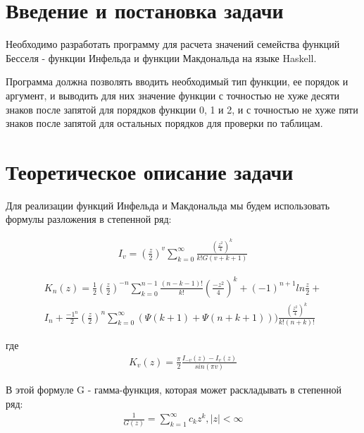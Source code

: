 \documentclass[a4paper,14pt]{extarticle}
\begin{document}
\section{Введение и постановка задачи}
Необходимо разработать программу для расчета значений семейства функций Бесселя - функции Инфельда и функции Макдональда на языке Haskell.

Программа должна позволять вводить необходимый тип функции, ее порядок и аргумент, и выводить для них значение функции с точностью не хуже десяти знаков после запятой для порядков функции 0, 1 и 2, и с точностью не хуже пяти знаков после запятой для остальных порядков для проверки по таблицам. 

\section{Теоретическое описание задачи}
Для реализации функций Инфельда и Макдональда мы будем использовать формулы разложения в степенной ряд:

\begin{align*}
	I_v = (\frac{z}{2})^v \sum_{k=0}^{\infty} 
	\frac{(\frac{z^2}{4})^k}{k!G(v+k+1)}
\end{align*}

\begin{multline*}
	K_n(z) = \frac{1}{2} (\frac{z}{2})^{-n} \sum_{k=0}^{n-1} 
	\frac{(n-k-1)!}{k!} (\frac{-z^2}{4})^k + (-1)^{n+1} ln \frac{z}{2} + \\
	I_n + \frac{-1^n}{2} (\frac{z}{2})^n \sum_{k=0}^{\infty}
	(\Psi(k+1)+\Psi(n+k+1))) \frac{(\frac{z^2}{4})^k}{k!(n+k)!}
\end{multline*}

где
\begin{align*}
	K_v(z) = \frac{\pi}{2} \frac{I_{-v}(z)-I_v(z)}{sin(\pi v)}
\end{align*}


В этой формуле G - гамма-функция, которая может раскладывать в степенной ряд:
\begin{align*}
	\frac{1}{G(z)} = \sum_{k=1}^{\infty} c_k z^k, |z| < \infty
\end{align*}
\end{document}
